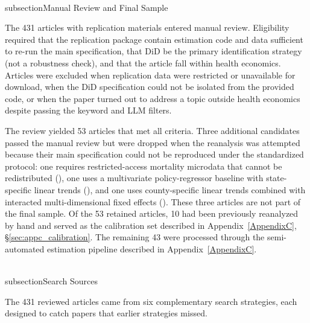 \\subsection{Manual Review and Final Sample}

The 431 articles with replication materials entered manual review. Eligibility required that the replication package contain estimation code and data sufficient to re-run the main specification, that DiD be the primary identification strategy (not a robustness check), and that the article fall within health economics. Articles were excluded when replication data were restricted or unavailable for download, when the DiD specification could not be isolated from the provided code, or when the paper turned out to address a topic outside health economics despite passing the keyword and LLM filters.

The review yielded 53 articles that met all criteria. Three additional candidates passed the manual review but were dropped when the reanalysis was attempted because their main specification could not be reproduced under the standardized protocol: one requires restricted-access mortality microdata that cannot be redistributed (\textcite{moorthy2025bluecollar}), one uses a multivariate policy-regressor baseline with state-specific linear trends (\textcite{myers2017power}), and one uses county-specific linear trends combined with interacted multi-dimensional fixed effects (\textcite{kuziemko2018managed}). These three articles are not part of the final sample. Of the 53 retained articles, 10 had been previously reanalyzed by hand and served as the calibration set described in Appendix~\ref{AppendixC}, §\ref{sec:appc_calibration}. The remaining 43 were processed through the semi-automated estimation pipeline described in Appendix~\ref{AppendixC}.

\\subsection{Search Sources}

The 431 reviewed articles came from six complementary search strategies, each designed to catch papers that earlier strategies missed.

